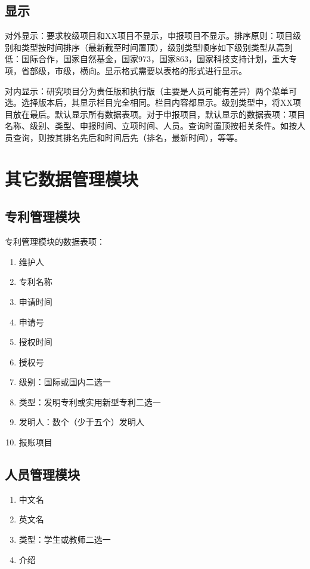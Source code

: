 \subsection{显示}

对外显示：要求校级项目和XX项目不显示，申报项目不显示。排序原则：项目级别和类型按时间排序（最新截至时间置顶），级别类型顺序如下级别类型从高到低：国际合作，国家自然基金，国家973，国家863，国家科技支持计划，重大专项，省部级，市级，横向。显示格式需要以表格的形式进行显示。

对内显示：研究项目分为责任版和执行版（主要是人员可能有差异）两个菜单可选。选择版本后，其显示栏目完全相同。栏目内容都显示。级别类型中，将XX项目放在最后。默认显示所有数据表项。对于申报项目，默认显示的数据表项：项目名称、级别、类型、申报时间、立项时间、人员。查询时置顶按相关条件。如按人员查询，则按其排名先后和时间后先（排名，最新时间），等等。

\section{其它数据管理模块}\subsection{专利管理模块}

专利管理模块的数据表项：

\begin{enumerate}
\item 维护人
\item 专利名称
\item 申请时间
\item 申请号
\item 授权时间
\item 授权号
\item 级别：国际或国内二选一
\item 类型：发明专利或实用新型专利二选一
\item 发明人：数个（少于五个）发明人
\item 报账项目
\end{enumerate}

\subsection{人员管理模块}

\begin{enumerate}
\item 中文名
\item 英文名
\item 类型：学生或教师二选一
\item 介绍
\end{enumerate}

